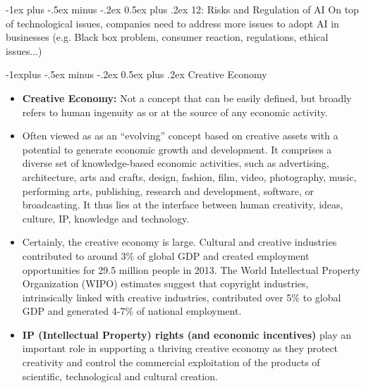\documentclass[12pt, landscape]{article}
\makeatletter
\renewcommand{\section}{\@startsection{section}{1}{0mm}%
                                {-1ex plus -.5ex minus -.2ex}%
                                {0.5ex plus .2ex}%
                                {\normalfont\large\bfseries}}
\renewcommand{\subsection}{\@startsection{subsection}{2}{0mm}%
                                {-1explus -.5ex minus -.2ex}%
                                {0.5ex plus .2ex}%
                                {\normalfont\normalsize\bfseries}}
\makeatother
\begin{document}
\begin{multicols*}{3}
\vfill\null
\columnbreak


\section{12: Risks and Regulation of AI}
On top of technological issues, companies need to address more issues to adopt AI in businesses (e.g. Black box problem, consumer reaction, regulations, ethical issues...)

\subsection{Creative Economy}
\begin{itemize}
\item \textbf{Creative Economy:} Not a concept that can be easily defined, but broadly refers to human ingenuity as or at the source of any economic activity.
\item Often viewed as as an “evolving” concept based on creative assets with a potential to generate economic growth and development. It comprises a diverse set of knowledge-based economic activities, such as advertising, architecture, arts and crafts, design, fashion, film, video, photography, music, performing arts, publishing, research and development, software, or broadcasting. It thus lies at the interface between human creativity, ideas, culture, IP, knowledge and technology.
\item Certainly, the creative economy is large. Cultural and creative industries contributed to around 3\% of global GDP and created employment opportunities for 29.5 million people in 2013. The World Intellectual Property Organization (WIPO) estimates suggest that copyright industries, intrinsically linked with creative industries, contributed over 5\% to global GDP and generated 4-7\% of national employment.
\item \textbf{IP (Intellectual Property) rights (and economic incentives)} play an important role in supporting a thriving creative economy as they protect creativity and control the commercial exploitation of the products of scientific, technological and cultural creation.
\end{itemize}


\end{multicols*}
\end{document}
